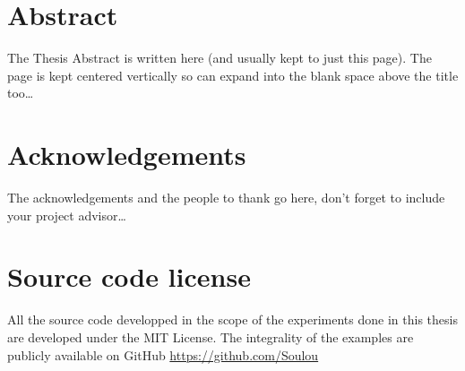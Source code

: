 \documentclass[a4paper, 12pt, oneside]{Thesis}  %
\begin{document}




\chapter{Abstract}

The Thesis Abstract is written here (and usually kept to just this page). The page is kept centered vertically so can expand into the blank space above the title too\ldots


\clearpage  %


\chapter{Acknowledgements}

The acknowledgements and the people to thank go here, don't forget to include
your project advisor\ldots

\clearpage  %
\chapter{Source code license}

All the source code developped in the scope of the experiments done in this
thesis are developed under the MIT License. The integrality of the examples
are publicly available on GitHub \url{https://github.com/Soulou}
\end{document}
